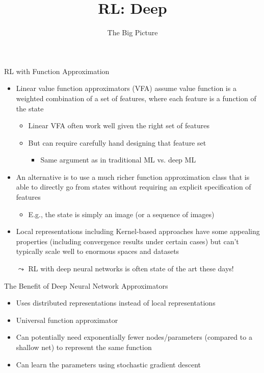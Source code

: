 \documentclass[aspectratio=169]{../latex_main/tntbeamer}  %
\title[RL: Deep Reinforcement Learning]{RL: Deep}
\subtitle{The Big Picture}
\begin{document}
	
	\maketitle

\begin{frame}[c]{RL with Function Approximation}
	
	\begin{itemize}
		\item Linear value function approximators (VFA) assume value function is a weighted combination of a set of features, where each feature is a function of the state
		\begin{itemize}
		\item Linear VFA often work well given the \alert{right set of features}
		\item But can require carefully hand designing that feature set
		\begin{itemize}
			\item Same argument as in traditional ML vs. deep ML
		\end{itemize}
		\end{itemize}
        \pause
		\item An alternative is to use a much richer function approximation class that is able to directly go from states without requiring an explicit specification of features
		\begin{itemize}
			\item E.g., the state is simply an image (or a sequence of images)
		\end{itemize}
        \pause
		\item Local representations including Kernel-based approaches have some	appealing properties (including convergence results under certain	cases) but can’t typically scale well to enormous spaces and datasets
		\item[$\leadsto$] RL with deep neural networks is often state of the art these days!
	\end{itemize}

\end{frame}
\begin{frame}[c]{The Benefit of Deep Neural Network Approximators}
	
	\begin{itemize}
		\item Uses distributed representations instead of local representations
		\item Universal function approximator
		\item Can potentially need exponentially fewer nodes/parameters (compared to
		a shallow net) to represent the same function
		\item Can learn the parameters using stochastic gradient descent
	\end{itemize}

\end{frame}
\end{document}
